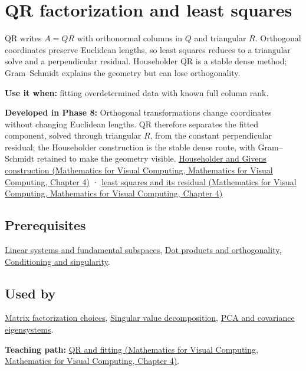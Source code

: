 \hypertarget{appendix-c3421e6b4f2c}{}\label{referencestart:appendix-c3421e6b4f2c}
\section{QR factorization and least squares}\label{appendix-c3421e6b4f2c-qr-factorization-and-least-squares}

QR writes \(A=QR\) with orthonormal columns in \(Q\) and triangular \(R\). Orthogonal coordinates preserve Euclidean lengths, so least squares reduces to a triangular solve and a perpendicular residual. Householder QR is a stable dense method; Gram--Schmidt explains the geometry but can lose orthogonality.

\textbf{Use it when:} fitting overdetermined data with known full column rank.

\textbf{Developed in Phase 8:} Orthogonal transformations change coordinates without changing Euclidean lengths. QR therefore separates the fitted component, solved through triangular \(R\), from the constant perpendicular residual; the Householder construction is the stable dense route, with Gram--Schmidt retained to make the geometry visible. \href{../02-Mathematics-for-Visual-Computing/main.pdf\#nameddest=01-foundations-i-ch020-reflections-and-plane-rotations-build-qr-without-losing-lengths}{Householder and Givens construction (Mathematics for Visual Computing, Mathematics for Visual Computing, Chapter 4)} · \href{../02-Mathematics-for-Visual-Computing/main.pdf\#nameddest=01-foundations-i-ch020-qr-turns-least-squares-into-a-triangular-solve-plus-an-irreducible-residual}{least squares and its residual (Mathematics for Visual Computing, Mathematics for Visual Computing, Chapter 4)}

\subsection{Prerequisites}\label{appendix-c3421e6b4f2c-prerequisites}

\hyperref[appendix-8572a4a060c1]{Linear systems and fundamental subspaces}, \hyperref[appendix-8bc4e8fc547c]{Dot products and orthogonality}, \hyperref[appendix-8f6a01f284a7]{Conditioning and singularity}.

\subsection{Used by}\label{appendix-c3421e6b4f2c-used-by}

\hyperref[appendix-221a483bec2d]{Matrix factorization choices}, \hyperref[appendix-1fad5e7f36fa]{Singular value decomposition}, \hyperref[appendix-ad175ef3c5bf]{PCA and covariance eigensystems}.

\textbf{Teaching path:} \href{../02-Mathematics-for-Visual-Computing/main.pdf\#nameddest=01-foundations-i-ch020-structure-makes-a-decomposition-a-better-tool-than-generic-elimination}{QR and fitting (Mathematics for Visual Computing, Mathematics for Visual Computing, Chapter 4)}.
